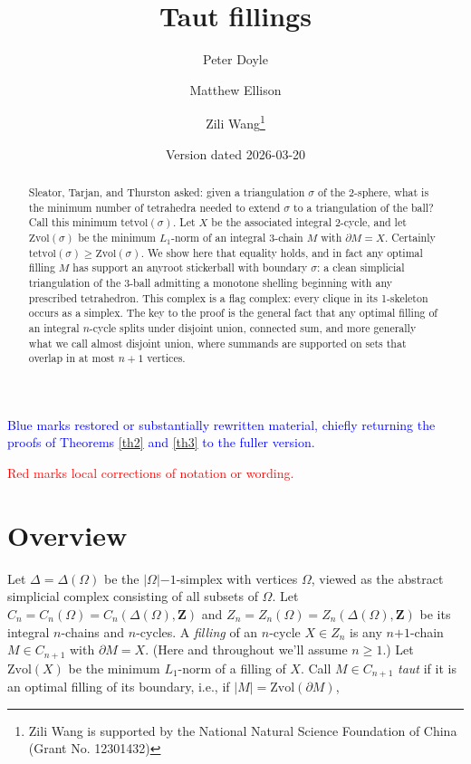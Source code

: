 \documentclass[12pt]{article}
\title{Taut fillings}
\author{Peter Doyle \and Matthew Ellison \and Zili Wang\thanks{
Zili Wang is supported by
the National Natural Science Foundation of China (Grant No. 12301432)
}}
\date{Version dated 2026-03-20
}
\def\ZZ{\mathbf{Z}}
\def\del{\partial}
\newcommand{\kw}{\mathrm}
\newcommand{\Zvol}{\kw{Zvol}}
\newcommand{\tetvol}{\kw{tetvol}}
\newcommand{\pls}{\mathord{+}}
\newcommand{\mns}{\mathord{-}}
\begin{document}
\maketitle

{\small\noindent\textcolor{blue}{Blue marks restored or substantially rewritten material, chiefly returning the proofs of Theorems \ref{th2} and \ref{th3} to the fuller version.}\par\noindent\textcolor{red}{Red marks local corrections of notation or wording.}\par\medskip}

\begin{abstract}
Sleator, Tarjan, and Thurston asked:
given a triangulation $\sigma$ of the 2-sphere,
what is the minimum number of tetrahedra needed to 
extend $\sigma$ to a triangulation of the ball?
Call this minimum $\tetvol(\sigma)$.
Let $X$ be the associated integral 2-cycle,
and let $\Zvol(\sigma)$ be the minimum $L_1$-norm
of an integral 3-chain $M$
with $\del M = X$.
Certainly $\tetvol(\sigma) \geq \Zvol(\sigma)$.
We show here that equality holds, and in fact
any optimal filling $M$ 
has support an anyroot stickerball with boundary $\sigma$:
a clean simplicial triangulation of the 3-ball admitting a monotone shelling
beginning with any prescribed tetrahedron.
This complex is a flag complex:
every clique in its 1-skeleton occurs as a simplex.
The key to the proof is the general
fact that any optimal filling of an integral $n$-cycle
splits under disjoint union, connected sum, and more generally
what we call almost disjoint union,
where summands are supported on sets that overlap in at most $n+1$ vertices.
\end{abstract}

\section{Overview}
Let $\Delta = \Delta(\Omega)$ be the $|\Omega|\mns 1$-simplex
with vertices $\Omega$,
viewed as the abstract simplicial complex consisting of all subsets of
$\Omega$.
Let $C_n=C_n(\Omega)=C_n(\Delta(\Omega),\ZZ)$
and $Z_n=Z_n(\Omega)=Z_n(\Delta(\Omega),\ZZ)$
be its integral $n$-chains and $n$-cycles.
A \emph{filling} of an $n$-cycle $X \in Z_n$ is any
$n\pls 1$-chain $M \in C_{n+1}$ with $\del M = X$.
(Here and throughout we'll assume $n\geq 1$.)
Let $\Zvol(X)$ be the minimum $L_1$-norm of a filling of $X$.
Call $M \in C_{n+1}$ \emph{taut} if it is an optimal filling
of its boundary, i.e., if $|M|=\Zvol(\del M)$,
\end{document}
